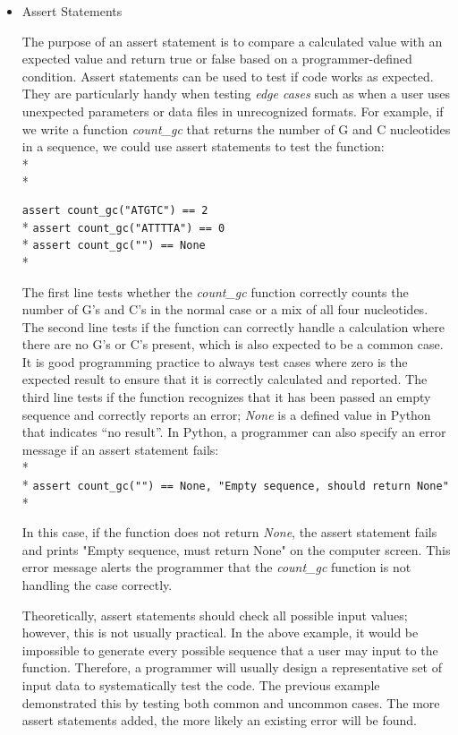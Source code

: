 \documentclass[ChapterTOCs,krantz2]{krantz} %
\begin{document}
\begin{itemize}
\item Assert Statements

The purpose of an assert statement is to compare
a calculated value with an expected value and return true or false
based on a programmer-defined condition. Assert statements can be used to
test if code works as expected.  They are
particularly handy when testing \emph{edge cases} such as when a user
uses unexpected parameters or data files in unrecognized formats.
For example, if we write a function \emph{count\_gc} that returns the number of
G and C nucleotides in a sequence, we could use assert statements to test the
function:\\* \\*

\texttt{assert count\_gc("ATGTC") == 2}\\*
\texttt{assert count\_gc("ATTTTA") == 0}\\*
\texttt{assert count\_gc("") == None}\\*

The first line tests whether the \emph{count\_gc} function correctly counts the number
of G's and C's in the normal case or a mix of all four nucleotides.  The second
line tests if the function can correctly handle a calculation where there are
no G's or C's present, which is also expected to be a common case.  It is good
programming practice to always test cases where zero is the expected result to
ensure that it is correctly calculated and reported.  The third line tests if
the function recognizes that it has been passed an empty sequence and correctly
reports an error; \emph{None} is a defined value in Python that indicates ``no result''. In
Python, a programmer can also specify an error message if an assert statement
fails:\\* \\*
\texttt{assert count\_gc("") == None, "Empty sequence, should return None"}\\*

In this case, if the function does not return \emph{None}, the assert statement
fails and prints "Empty sequence, must return None" on the computer
screen.
This error message alerts the programmer that the \emph{count\_gc} function
is not handling the case correctly.  

Theoretically, assert statements should check all possible input
values; however, this is not usually practical. In the above example, it
would be impossible to generate every possible sequence that a user may
input to the function.  Therefore, a programmer will usually design
a representative set of input data to systematically test the code.  The
previous example demonstrated this by testing 
both common and uncommon cases.  The more assert statements
added, the more likely an existing error will be found.  


\end{itemize}
\end{document}

